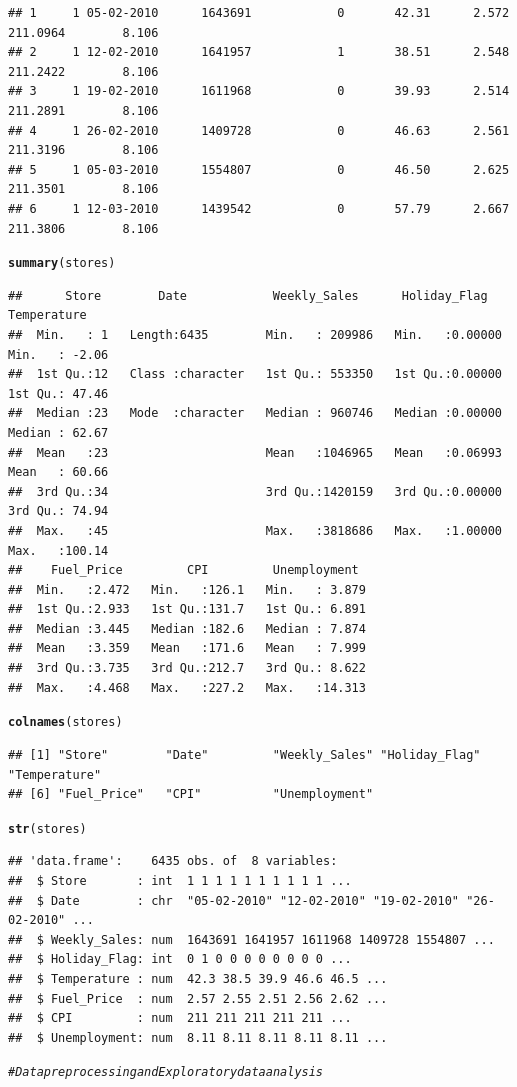 \documentclass{article}\usepackage[]{graphicx}\usepackage[]{color}
\makeatletter
\newcommand{\hlcom}[1]{\textcolor[rgb]{0.678,0.584,0.686}{\textit{#1}}}%
\newcommand{\hlstd}[1]{\textcolor[rgb]{0.345,0.345,0.345}{#1}}%
\newcommand{\hlkwd}[1]{\textcolor[rgb]{0.737,0.353,0.396}{\textbf{#1}}}%
\newenvironment{kframe}{%
 \def\at@end@of@kframe{}%
 \ifinner\ifhmode%
  \def\at@end@of@kframe{\end{minipage}}%
  \begin{minipage}{\columnwidth}%
 \fi\fi%
 \def\FrameCommand##1{\hskip\@totalleftmargin \hskip-\fboxsep
 \colorbox{shadecolor}{##1}\hskip-\fboxsep
     \hskip-\linewidth \hskip-\@totalleftmargin \hskip\columnwidth}%
 \MakeFramed {\advance\hsize-\width
   \@totalleftmargin\z@ \linewidth\hsize
   \@setminipage}}%
 {\par\unskip\endMakeFramed%
 \at@end@of@kframe}
\newenvironment{knitrout}{}{} %
\makeatother
\begin{document}
\begin{knitrout}
\begin{kframe}
\begin{verbatim}
## 1     1 05-02-2010      1643691            0       42.31      2.572 211.0964        8.106
## 2     1 12-02-2010      1641957            1       38.51      2.548 211.2422        8.106
## 3     1 19-02-2010      1611968            0       39.93      2.514 211.2891        8.106
## 4     1 26-02-2010      1409728            0       46.63      2.561 211.3196        8.106
## 5     1 05-03-2010      1554807            0       46.50      2.625 211.3501        8.106
## 6     1 12-03-2010      1439542            0       57.79      2.667 211.3806        8.106
\end{verbatim}
\begin{alltt}
\hlkwd{summary}\hlstd{(stores)}
\end{alltt}
\begin{verbatim}
##      Store        Date            Weekly_Sales      Holiday_Flag      Temperature    
##  Min.   : 1   Length:6435        Min.   : 209986   Min.   :0.00000   Min.   : -2.06  
##  1st Qu.:12   Class :character   1st Qu.: 553350   1st Qu.:0.00000   1st Qu.: 47.46  
##  Median :23   Mode  :character   Median : 960746   Median :0.00000   Median : 62.67  
##  Mean   :23                      Mean   :1046965   Mean   :0.06993   Mean   : 60.66  
##  3rd Qu.:34                      3rd Qu.:1420159   3rd Qu.:0.00000   3rd Qu.: 74.94  
##  Max.   :45                      Max.   :3818686   Max.   :1.00000   Max.   :100.14  
##    Fuel_Price         CPI         Unemployment   
##  Min.   :2.472   Min.   :126.1   Min.   : 3.879  
##  1st Qu.:2.933   1st Qu.:131.7   1st Qu.: 6.891  
##  Median :3.445   Median :182.6   Median : 7.874  
##  Mean   :3.359   Mean   :171.6   Mean   : 7.999  
##  3rd Qu.:3.735   3rd Qu.:212.7   3rd Qu.: 8.622  
##  Max.   :4.468   Max.   :227.2   Max.   :14.313
\end{verbatim}
\begin{alltt}
\hlkwd{colnames}\hlstd{(stores)}
\end{alltt}
\begin{verbatim}
## [1] "Store"        "Date"         "Weekly_Sales" "Holiday_Flag" "Temperature" 
## [6] "Fuel_Price"   "CPI"          "Unemployment"
\end{verbatim}
\begin{alltt}
\hlkwd{str}\hlstd{(stores)}
\end{alltt}
\begin{verbatim}
## 'data.frame':	6435 obs. of  8 variables:
##  $ Store       : int  1 1 1 1 1 1 1 1 1 1 ...
##  $ Date        : chr  "05-02-2010" "12-02-2010" "19-02-2010" "26-02-2010" ...
##  $ Weekly_Sales: num  1643691 1641957 1611968 1409728 1554807 ...
##  $ Holiday_Flag: int  0 1 0 0 0 0 0 0 0 0 ...
##  $ Temperature : num  42.3 38.5 39.9 46.6 46.5 ...
##  $ Fuel_Price  : num  2.57 2.55 2.51 2.56 2.62 ...
##  $ CPI         : num  211 211 211 211 211 ...
##  $ Unemployment: num  8.11 8.11 8.11 8.11 8.11 ...
\end{verbatim}
\begin{alltt}
\hlcom{#Data preprocessing and Exploratory data analysis}


\end{alltt}
\end{kframe}
\end{knitrout}
\end{document}
